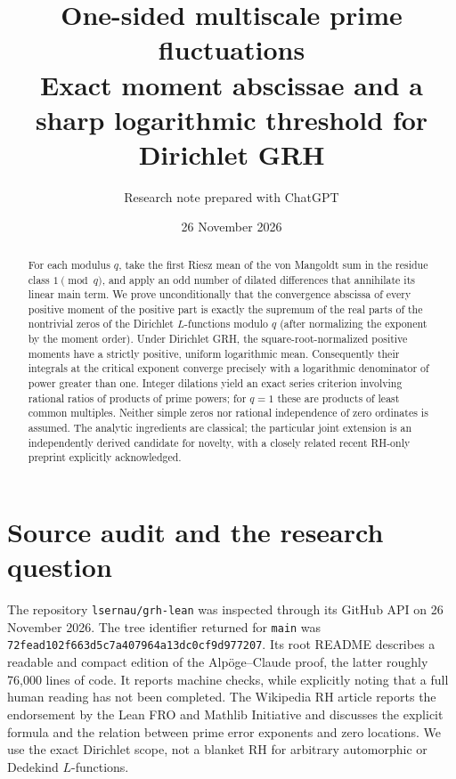 \documentclass[11pt]{article}
\title{One-sided multiscale prime fluctuations\\\large Exact moment abscissae and a sharp logarithmic threshold for Dirichlet GRH}
\author{Research note prepared with ChatGPT}
\date{26 November 2026}
\begin{document}
\maketitle
\begin{abstract}
For each modulus $q$, take the first Riesz mean of the von Mangoldt sum in the residue class $1\pmod q$, and apply an odd number of dilated differences that annihilate its linear main term. We prove unconditionally that the convergence abscissa of every positive moment of the positive part is exactly the supremum of the real parts of the nontrivial zeros of the Dirichlet $L$-functions modulo $q$ (after normalizing the exponent by the moment order). Under Dirichlet GRH, the square-root-normalized positive moments have a strictly positive, uniform logarithmic mean. Consequently their integrals at the critical exponent converge precisely with a logarithmic denominator of power greater than one. Integer dilations yield an exact series criterion involving rational ratios of products of prime powers; for $q=1$ these are products of least common multiples. Neither simple zeros nor rational independence of zero ordinates is assumed. The analytic ingredients are classical; the particular joint extension is an independently derived candidate for novelty, with a closely related recent RH-only preprint explicitly acknowledged.
\end{abstract}

\section{Source audit and the research question}
The repository \texttt{lsernau/grh-lean} was inspected through its GitHub API on 26 November 2026. The tree identifier returned for \texttt{main} was \texttt{72fead102f663d5c7a407964a13dc0cf9d977207}. Its root README describes a readable and compact edition of the Alp\"oge--Claude proof, the latter roughly 76,000 lines of code. It reports machine checks, while explicitly noting that a full human reading has not been completed. The Wikipedia RH article \cite{wiki} reports the endorsement by the Lean FRO and Mathlib Initiative and discusses the explicit formula and the relation between prime error exponents and zero locations. We use the exact Dirichlet scope, not a blanket RH for arbitrary automorphic or Dedekind $L$-functions.
\end{document}
